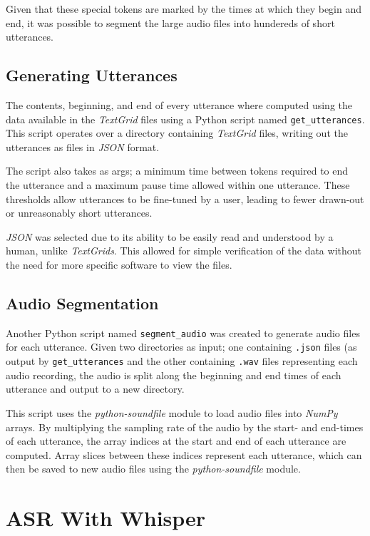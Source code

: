 Given that these special tokens are marked by the times at which they begin and end, it was possible to segment the large audio files into hundereds of short utterances.

\subsection{Generating Utterances}

The contents, beginning, and end of every utterance where computed using the data available in the \emph{TextGrid} files using a Python script named \texttt{get_utterances}.
This script operates over a directory containing \emph{TextGrid} files, writing out the utterances as files in \emph{JSON} format.

The script also takes as args; a minimum time between tokens required to end the utterance and a maximum pause time allowed within one utterance.
These thresholds allow utterances to be fine-tuned by a user, leading to fewer drawn-out or unreasonably short utterances.

\emph{JSON} was selected due to its ability to be easily read and understood by a human, unlike \emph{TextGrids}.
This allowed for simple verification of the data without the need for more specific software to view the files.

\subsection{Audio Segmentation}

Another Python script named \texttt{segment_audio} was created to generate audio files for each utterance. 
Given two directories as input; one containing \texttt{.json} files (as output by \texttt{get_utterances} and the other containing \texttt{.wav} files representing each audio recording, the audio is split along the beginning and end times of each utterance and output to a new directory.

This script uses the \emph{python-soundfile} module\cite{pysoundfile} to load audio files into \emph{NumPy}\cite{numpy} arrays.
By multiplying the sampling rate of the audio by the start- and end-times of each utterance, the array indices at the start and end of each utterance are computed.
Array slices between these indices represent each utterance, which can then be saved to new audio files using the \emph{python-soundfile} module.

\section{ASR With Whisper}
